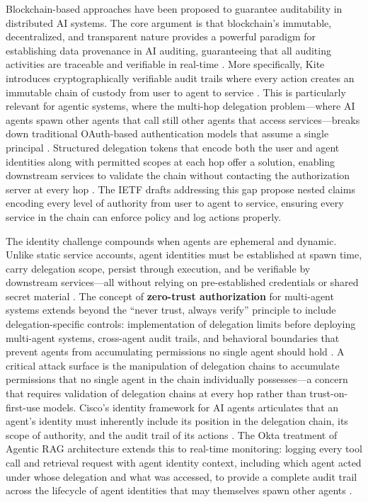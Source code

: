 Blockchain-based approaches have been proposed to guarantee auditability in distributed AI systems. The core argument is that blockchain's immutable, decentralized, and transparent nature provides a powerful paradigm for establishing data provenance in AI auditing, guaranteeing that all auditing activities are traceable and verifiable in real-time \cite{blockchain2023accountability}. More specifically, Kite introduces cryptographically verifiable audit trails where every action creates an immutable chain of custody from user to agent to service \cite{cheng2025trustless}. This is particularly relevant for agentic systems, where the multi-hop delegation problem---where AI agents spawn other agents that call still other agents that access services---breaks down traditional OAuth-based authentication models that assume a single principal \cite{workos2025multihop}. Structured delegation tokens that encode both the user and agent identities along with permitted scopes at each hop offer a solution, enabling downstream services to validate the chain without contacting the authorization server at every hop \cite{scalekit2025delegated}. The IETF drafts addressing this gap propose nested claims encoding every level of authority from user to agent to service, ensuring every service in the chain can enforce policy and log actions properly.

The identity challenge compounds when agents are ephemeral and dynamic. Unlike static service accounts, agent identities must be established at spawn time, carry delegation scope, persist through execution, and be verifiable by downstream services---all without relying on pre-established credentials or shared secret material \cite{opal2025identity}. The concept of \textbf{zero-trust authorization} for multi-agent systems extends beyond the ``never trust, always verify'' principle to include delegation-specific controls: implementation of delegation limits before deploying multi-agent systems, cross-agent audit trails, and behavioral boundaries that prevent agents from accumulating permissions no single agent should hold \cite{gupta2025zerotrust}. A critical attack surface is the manipulation of delegation chains to accumulate permissions that no single agent in the chain individually possesses---a concern that requires validation of delegation chains at every hop rather than trust-on-first-use models. Cisco's identity framework for AI agents articulates that an agent's identity must inherently include its position in the delegation chain, its scope of authority, and the audit trail of its actions \cite{cisco2025identity}. The Okta treatment of Agentic RAG architecture extends this to real-time monitoring: logging every tool call and retrieval request with agent identity context, including which agent acted under whose delegation and what was accessed, to provide a complete audit trail across the lifecycle of agent identities that may themselves spawn other agents \cite{okta2025agenticrag}.

